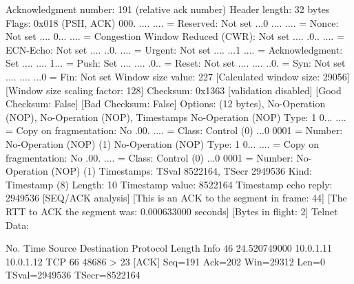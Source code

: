     Acknowledgment number: 191    (relative ack number)
    Header length: 32 bytes
    Flags: 0x018 (PSH, ACK)
        000. .... .... = Reserved: Not set
        ...0 .... .... = Nonce: Not set
        .... 0... .... = Congestion Window Reduced (CWR): Not set
        .... .0.. .... = ECN-Echo: Not set
        .... ..0. .... = Urgent: Not set
        .... ...1 .... = Acknowledgment: Set
        .... .... 1... = Push: Set
        .... .... .0.. = Reset: Not set
        .... .... ..0. = Syn: Not set
        .... .... ...0 = Fin: Not set
    Window size value: 227
    [Calculated window size: 29056]
    [Window size scaling factor: 128]
    Checksum: 0x1363 [validation disabled]
        [Good Checksum: False]
        [Bad Checksum: False]
    Options: (12 bytes), No-Operation (NOP), No-Operation (NOP), Timestamps
        No-Operation (NOP)
            Type: 1
                0... .... = Copy on fragmentation: No
                .00. .... = Class: Control (0)
                ...0 0001 = Number: No-Operation (NOP) (1)
        No-Operation (NOP)
            Type: 1
                0... .... = Copy on fragmentation: No
                .00. .... = Class: Control (0)
                ...0 0001 = Number: No-Operation (NOP) (1)
        Timestamps: TSval 8522164, TSecr 2949536
            Kind: Timestamp (8)
            Length: 10
            Timestamp value: 8522164
            Timestamp echo reply: 2949536
    [SEQ/ACK analysis]
        [This is an ACK to the segment in frame: 44]
        [The RTT to ACK the segment was: 0.000633000 seconds]
        [Bytes in flight: 2]
Telnet
    Data: 

No.     Time           Source                Destination           Protocol Length Info
     46 24.520749000   10.0.1.11             10.0.1.12             TCP      66     48686 > 23 [ACK] Seq=191 Ack=202 Win=29312 Len=0 TSval=2949536 TSecr=8522164

